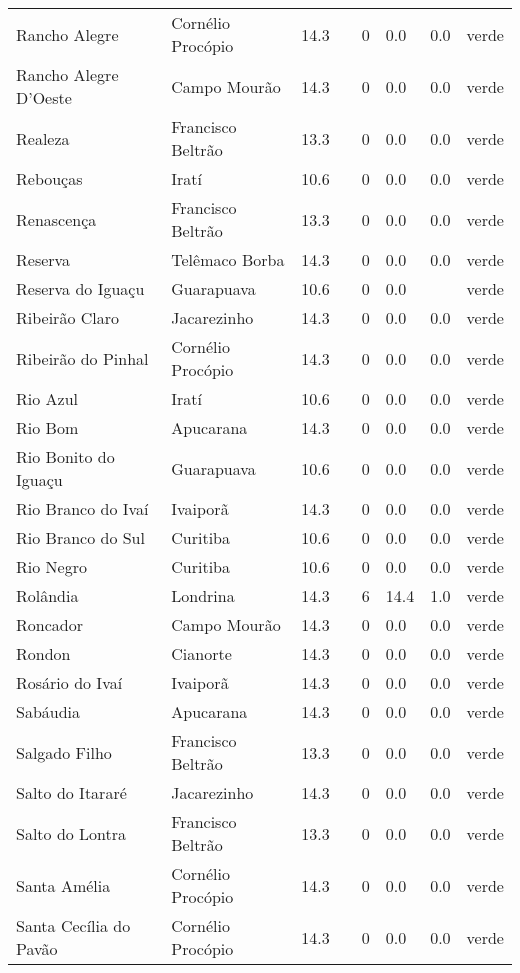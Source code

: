 \begin{longtable}{l|lllllll}
  Rancho Alegre & Cornélio Procópio & 14.3 &  & 0 & 0.0 & 0.0 & verde \\ 
  Rancho Alegre D'Oeste & Campo Mourão & 14.3 &  & 0 & 0.0 & 0.0 & verde \\ 
  Realeza & Francisco Beltrão & 13.3 &  & 0 & 0.0 & 0.0 & verde \\ 
  Rebouças & Iratí & 10.6 &  & 0 & 0.0 & 0.0 & verde \\ 
  Renascença & Francisco Beltrão & 13.3 &  & 0 & 0.0 & 0.0 & verde \\ 
  Reserva & Telêmaco Borba & 14.3 &  & 0 & 0.0 & 0.0 & verde \\ 
  Reserva do Iguaçu & Guarapuava & 10.6 &  & 0 & 0.0 &  & verde \\ 
  Ribeirão Claro & Jacarezinho & 14.3 &  & 0 & 0.0 & 0.0 & verde \\ 
  Ribeirão do Pinhal & Cornélio Procópio & 14.3 &  & 0 & 0.0 & 0.0 & verde \\ 
  Rio Azul & Iratí & 10.6 &  & 0 & 0.0 & 0.0 & verde \\ 
  Rio Bom & Apucarana & 14.3 &  & 0 & 0.0 & 0.0 & verde \\ 
  Rio Bonito do Iguaçu & Guarapuava & 10.6 &  & 0 & 0.0 & 0.0 & verde \\ 
  Rio Branco do Ivaí & Ivaiporã & 14.3 &  & 0 & 0.0 & 0.0 & verde \\ 
  Rio Branco do Sul & Curitiba & 10.6 &  & 0 & 0.0 & 0.0 & verde \\ 
  Rio Negro & Curitiba & 10.6 &  & 0 & 0.0 & 0.0 & verde \\ 
  Rolândia & Londrina & 14.3 &  & 6 & 14.4 & 1.0 & verde \\ 
  Roncador & Campo Mourão & 14.3 &  & 0 & 0.0 & 0.0 & verde \\ 
  Rondon & Cianorte & 14.3 &  & 0 & 0.0 & 0.0 & verde \\ 
  Rosário do Ivaí & Ivaiporã & 14.3 &  & 0 & 0.0 & 0.0 & verde \\ 
  Sabáudia & Apucarana & 14.3 &  & 0 & 0.0 & 0.0 & verde \\ 
  Salgado Filho & Francisco Beltrão & 13.3 &  & 0 & 0.0 & 0.0 & verde \\ 
  Salto do Itararé & Jacarezinho & 14.3 &  & 0 & 0.0 & 0.0 & verde \\ 
  Salto do Lontra & Francisco Beltrão & 13.3 &  & 0 & 0.0 & 0.0 & verde \\ 
  Santa Amélia & Cornélio Procópio & 14.3 &  & 0 & 0.0 & 0.0 & verde \\ 
  Santa Cecília do Pavão & Cornélio Procópio & 14.3 &  & 0 & 0.0 & 0.0 & verde \\ 

\end{longtable}
